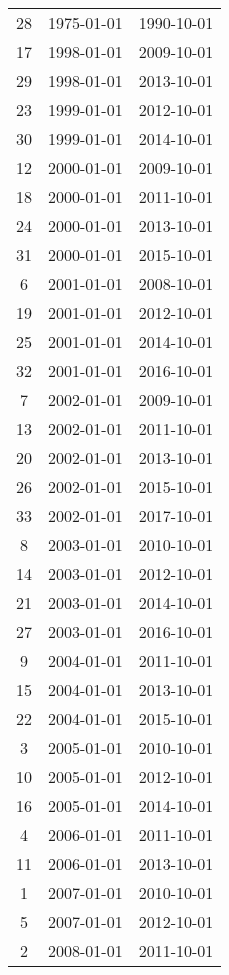 % 
\begin{tabular}{ccc}
  \hline
  \hline
28 & 1975-01-01 & 1990-10-01 \\ 
  17 & 1998-01-01 & 2009-10-01 \\ 
  29 & 1998-01-01 & 2013-10-01 \\ 
  23 & 1999-01-01 & 2012-10-01 \\ 
  30 & 1999-01-01 & 2014-10-01 \\ 
  12 & 2000-01-01 & 2009-10-01 \\ 
  18 & 2000-01-01 & 2011-10-01 \\ 
  24 & 2000-01-01 & 2013-10-01 \\ 
  31 & 2000-01-01 & 2015-10-01 \\ 
  6 & 2001-01-01 & 2008-10-01 \\ 
  19 & 2001-01-01 & 2012-10-01 \\ 
  25 & 2001-01-01 & 2014-10-01 \\ 
  32 & 2001-01-01 & 2016-10-01 \\ 
  7 & 2002-01-01 & 2009-10-01 \\ 
  13 & 2002-01-01 & 2011-10-01 \\ 
  20 & 2002-01-01 & 2013-10-01 \\ 
  26 & 2002-01-01 & 2015-10-01 \\ 
  33 & 2002-01-01 & 2017-10-01 \\ 
  8 & 2003-01-01 & 2010-10-01 \\ 
  14 & 2003-01-01 & 2012-10-01 \\ 
  21 & 2003-01-01 & 2014-10-01 \\ 
  27 & 2003-01-01 & 2016-10-01 \\ 
  9 & 2004-01-01 & 2011-10-01 \\ 
  15 & 2004-01-01 & 2013-10-01 \\ 
  22 & 2004-01-01 & 2015-10-01 \\ 
  3 & 2005-01-01 & 2010-10-01 \\ 
  10 & 2005-01-01 & 2012-10-01 \\ 
  16 & 2005-01-01 & 2014-10-01 \\ 
  4 & 2006-01-01 & 2011-10-01 \\ 
  11 & 2006-01-01 & 2013-10-01 \\ 
  1 & 2007-01-01 & 2010-10-01 \\ 
  5 & 2007-01-01 & 2012-10-01 \\ 
  2 & 2008-01-01 & 2011-10-01 \\ 
   \hline
\end{tabular}
